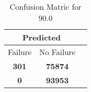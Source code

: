 \begin{table}[] 
\caption{Confusion Matric for 90.0} 
\label{Table: Prediction Accuracy-DMD90.0OnlySunEKF-ignoreReflection500.9EKF-top2-Reflection} 
\centering 
\begin{tabular} 
 {@{}ccc@{}} 
\toprule 
\multicolumn{2}{c}{\textbf{Predicted}}
 \\ \midrule 
\multicolumn{1}{|c|}{Failure} & 
\multicolumn{1}{c|}{No Failure}
 \\ \midrule 
\multicolumn{1}{|c|}{\color{green}\textbf{301}} & 
\multicolumn{1}{c|}{\color{red}\textbf{75874}}
 \\ \midrule 
\multicolumn{1}{|c|}{\color{red}\textbf{0}} & 
\multicolumn{1}{c|}{\color{green}\textbf{93953}}
 \\ \bottomrule 
\end{tabular} 
\end{table} 
